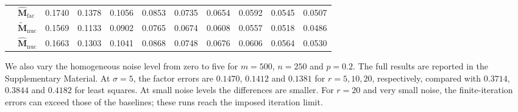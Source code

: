 \documentclass[numsec,webpdf,modern,large,namedate]{oup-authoring-template}
\theoremstyle{plain}
\theoremstyle{remark}
\newcommand{\M}{\bm{M}}
\begin{document}
\begin{table}[!htbp]
{\begin{tabular}{@{}llrrrrrrrrr@{}}
 & $\widehat{\M}_{\mathrm{fac}}$ & 0.1740 & 0.1378 & 0.1056 & 0.0853 & 0.0735 & 0.0654 & 0.0592 & 0.0545 & 0.0507 \\
 & $\widetilde{\M}_{\mathrm{nuc}}$ & 0.1569 & 0.1133 & 0.0902 & 0.0765 & 0.0674 & 0.0608 & 0.0557 & 0.0518 & 0.0486 \\
 & $\widehat{\M}_{\mathrm{nuc}}$ & 0.1663 & 0.1303 & 0.1041 & 0.0868 & 0.0748 & 0.0676 & 0.0606 & 0.0564 & 0.0530 \\
\bottomrule
\end{tabular}
}
\endgroup
\end{table}

We also vary the homogeneous noise level from zero to five for $m=500$, $n=250$ and $p=0.2$. The full results are reported in the Supplementary Material. At $\sigma=5$, the factor errors are $0.1470$, $0.1412$ and $0.1381$ for $r=5,10,20$, respectively, compared with $0.3714$, $0.3844$ and $0.4182$ for least squares. At small noise levels the differences are smaller. For $r=20$ and very small noise, the finite-iteration errors can exceed those of the baselines; these runs reach the imposed iteration limit.
\end{document}
